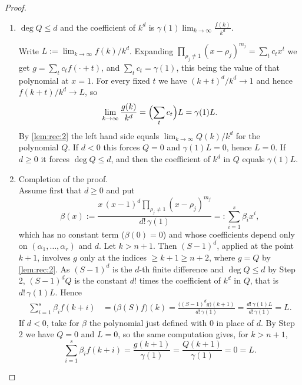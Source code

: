 \documentclass[12pt,a4paper]{amsart}%
\newcommand{\RamiA}[1]{{{#1}}}
\newcommand{\RamiD}[1]{{{#1}}}
\begin{document}
\begin{proof}
\begin{enumerate}[Step 1.]
We have $D=S^{e}\prod_{\rho_j\neq0,1}(S-\rho_j)^{m_j}$, so that $(Df)(k)$ involves the values of $f$ only at the indices $\geq k+e$. For every $j$ with $\rho_j\neq1$ the factor $(S-\rho_j)^{m_j}$ annihilates $k\mapsto P_j(k)\rho_j^k$, since $\deg P_j<m_j$. Hence, by \eqref{lem:rec:1},
    \begin{equation}\label{lem:rec:2}
    g(k)=Q(k)\quad(k\geq n+2),\qquad Q:=D(P_1) .
    \end{equation}
    \item \RamiA{$\deg Q\leq d$ and the coefficient of $k^d$ is $\gamma(1)\lim_{k\to \infty} \frac{f(k)}{k^d}$.}\\ 

    Write $L:=\lim_{k\to\infty}f(k)/k^d$. Expanding $\prod_{\rho_j\neq1}(x-\rho_j)^{m_j}=\sum_tc_tx^t$ we get $g=\sum_tc_tf(\cdot+t)$, and $\sum_tc_t=\gamma\RamiD{(1)}$, this being the value of that polynomial at $x=1$. For every fixed $t$ we have $(k+t)^d/k^d\to1$ and hence $f(k+t)/k^d\to L$, so
    $$\lim_{k\to\infty}\frac{g(k)}{k^d}=\Bigl(\sum_tc_t\Bigr)L=\gamma\RamiD{(1)} L .$$
    By \eqref{lem:rec:2} the left hand side equals $\lim_{k\to\infty}Q(k)/k^d$ for the polynomial $Q$. If $d<0$ this forces $Q=0$ and $\gamma\RamiD{(1)} L=0$, hence $L=0$. If $d\geq0$ it forces $\deg Q\leq d$, and then the coefficient of $k^d$ in $Q$ equals $\gamma\RamiD{(1)} L$.
    \item \RamiA{Completion of the proof.}\\
    Assume first that $d\geq0$ and put
    $$\beta(x):=\frac{x\,(x-1)^d\prod_{\rho_j\neq1}(x-\rho_j)^{m_j}}{d!\,\gamma\RamiD{(1)}}=:\sum_{i=1}^s\beta_ix^i ,$$
    which has no constant term ($\beta(0)=0$) and whose coefficients depend only on $(\alpha_1,\dots,\alpha_r)$ and $d$. Let $k>n+1$. Then $(S-1)^d$, applied at the point $k+1$, involves $g$ only at the indices $\geq k+1\geq n+2$, where $g=Q$ by \eqref{lem:rec:2}. As $(S-1)^d$ is the $d$-th finite difference and $\deg Q\leq d$ by Step 2, $(S-1)^dQ$ is the constant $d!$ times the coefficient of $k^d$ in $Q$, that is $d!\,\gamma\RamiD{(1)} L$. Hence
    \begin{align*}
    \sum_{i=1}^s\beta_i f(k+i)&=\bigl(\beta(S)f\bigr)(k)=\frac{\bigl((S-1)^dg\bigr)(k+1)}{d!\,\gamma\RamiD{(1)}}=\frac{d!\,\gamma\RamiD{(1)} L}{d!\,\gamma\RamiD{(1)}}=L .
    \end{align*}
    If $d<0$, take for $\beta$ the polynomial just defined with $0$ in place of $d$. By Step 2 we have $Q=0$ and $L=0$, so the same computation gives, for $k>n+1$,
    $$\sum_{i=1}^s\beta_i f(k+i)=\frac{g(k+1)}{\gamma\RamiD{(1)}}=\frac{Q(k+1)}{\gamma\RamiD{(1)}}=0=L .$$
 \end{enumerate}
    

\end{proof}
\end{document}

